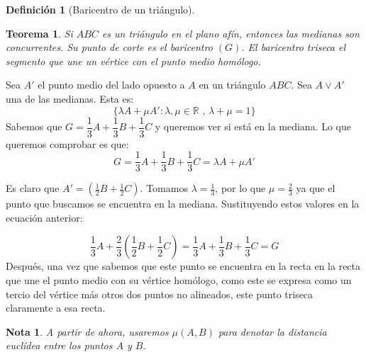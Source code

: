 \documentclass[11pt, a4paper]{article}
\makeatletter
\newif\IfInSansMode
\let\oldsf\sffamily
\renewcommand*{\sffamily}{\oldsf\mathversion{sans}\InSansModetrue}
\let\oldnorm\normalfont
\renewcommand*{\normalfont}{\oldnorm\InSansModefalse\mathversion{normal}}
\renewenvironment{proof}[1][\proofname] {\vspace{-15pt}\par\pushQED{\qed}\normalfont\topsep6\p@\@plus6\p@\relax\trivlist\item[\hskip\labelsep\it#1\@addpunct{.}]\ignorespaces}{\popQED\endtrivlist\@endpefalse}
\newcommand{\R}{\mathbb{R}}
\renewenvironment{proof}[1][\proofname] {\par\pushQED{\qed}\normalfont\topsep6\p@\@plus6\p@\relax\trivlist\item[\hskip\labelsep\itshape\sffamily#1\@addpunct{.}]\ignorespaces}{\popQED\endtrivlist\@endpefalse}
\theoremstyle{theorem-style}
\newtheorem{nth}{Teorema}[section]
\theoremstyle{definition-style}
\newtheorem{ndef}{Definición}[section]
\theoremstyle{remark-style}
\newtheorem*{nota}{Nota}
\theoremstyle{example-style}
\makeatother
\begin{document}
\begin{ndef}[Baricentro de un triángulo]
\begin{minipage}[]{0.27\textwidth}
\begin{center}
\end{center}

  \end{minipage}
\end{ndef}

\begin{nth}
  Si $ABC$ es un triángulo en el plano afín, entonces las medianas son concurrentes. Su punto de corte es el baricentro $(G)$. El baricentro triseca el segmento que une un vértice con el punto medio homólogo.


\end{nth}

\begin{proof}
  Sea $A'$ el punto medio del lado opuesto a $A$ en un triángulo $ABC$. Sea $A \vee A'$ una de las medianas. Esta es:
  \[
    \{\lambda A + \mu A': \lambda, \mu \in \R \text{ , } \lambda+\mu = 1\}
  \]
  Sabemos que $G = \dfrac{1}{3} A +  \dfrac{1}{3} B +  \dfrac{1}{3} C$ y queremos ver si está en la mediana. Lo que queremos comprobar es que:
  \[
    G = \dfrac{1}{3} A +  \dfrac{1}{3} B +  \dfrac{1}{3} C = \lambda A + \mu A'  
  \]
  
  Es claro que $A' = \left(\frac{1}{2}B + \frac{1}{2}C\right)$. Tomamos $\lambda = \frac{1}{3}$, por lo que $\mu = \frac{2}{3}$ ya que el punto que buscamos se encuentra en la mediana. Sustituyendo estos valores en la ecuación anterior:
  
  $$\dfrac{1}{3}A + \dfrac{2}{3}\left(\dfrac{1}{2}B+\dfrac{1}{2}C\right) = \frac{1}{3}A + \frac{1}{3}B + \frac{1}{3}C = G$$
	Después, una vez que sabemos que este punto se encuentra en la recta en la recta que une el punto medio con su vértice homólogo, como este se expresa como un tercio del vértice más otros dos puntos no alineados, este punto triseca claramente a esa recta.
\end{proof}

\begin{nota}
  A partir de ahora, usaremos $\mu(A,B)$ para denotar la distancia euclídea entre los puntos $A$ y $B$.
\end{nota}
\end{document}
